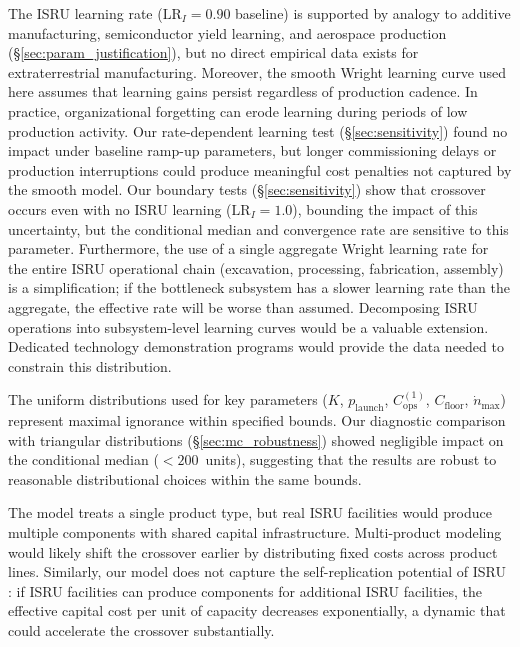\documentclass[preprint,12pt]{elsarticle}
\begin{document}
The ISRU learning rate ($\mathrm{LR}_I = 0.90$ baseline) is supported by analogy to additive manufacturing, semiconductor yield learning, and aerospace production (\S\ref{sec:param_justification}), but no direct empirical data exists for extraterrestrial manufacturing. Moreover, the smooth Wright learning curve used here assumes that learning gains persist regardless of production cadence. In practice, organizational forgetting \cite{benkard2000} can erode learning during periods of low production activity. Our rate-dependent learning test (\S\ref{sec:sensitivity}) found no impact under baseline ramp-up parameters, but longer commissioning delays or production interruptions could produce meaningful cost penalties not captured by the smooth model. Our boundary tests (\S\ref{sec:sensitivity}) show that crossover occurs even with no ISRU learning ($\mathrm{LR}_I = 1.0$), bounding the impact of this uncertainty, but the conditional median and convergence rate are sensitive to this parameter. Furthermore, the use of a single aggregate Wright learning rate for the entire ISRU operational chain (excavation, processing, fabrication, assembly) is a simplification; if the bottleneck subsystem has a slower learning rate than the aggregate, the effective rate will be worse than assumed. Decomposing ISRU operations into subsystem-level learning curves would be a valuable extension. Dedicated technology demonstration programs would provide the data needed to constrain this distribution.

The uniform distributions used for key parameters ($K$, $p_{\mathrm{launch}}$, $C_{\mathrm{ops}}^{(1)}$, $C_{\mathrm{floor}}$, $\dot{n}_{\max}$) represent maximal ignorance within specified bounds. Our diagnostic comparison with triangular distributions (\S\ref{sec:mc_robustness}) showed negligible impact on the conditional median ($<200$~units), suggesting that the results are robust to reasonable distributional choices within the same bounds.

The model treats a single product type, but real ISRU facilities would produce multiple components with shared capital infrastructure. Multi-product modeling would likely shift the crossover earlier by distributing fixed costs across product lines. Similarly, our model does not capture the self-replication potential of ISRU \cite{metzger2013}: if ISRU facilities can produce components for additional ISRU facilities, the effective capital cost per unit of capacity decreases exponentially, a dynamic that could accelerate the crossover substantially.
\end{document}
